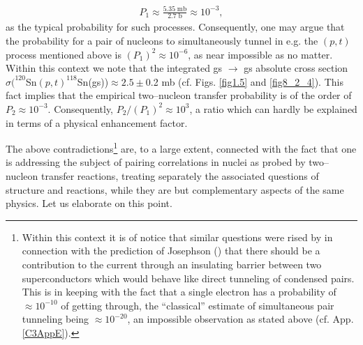 \begin{align}
P_1\approx\frac{5.35\; \text{mb}}{2.7\;\text{b}}\approx 10^{-3},
\end{align}
as the typical probability for such processes. Consequently, one may argue that the probability for a  pair of nucleons to simultaneously tunnel in e.g. the $(p,t)$ process mentioned above is $(P_1)^2\approx10^{-6}$, as near impossible as no matter. Within this context we note that the integrated gs $\rightarrow$ gs absolute cross section $\sigma(^{120}$Sn$(p,t)^{118}$Sn(gs))$\approx 2.5 \pm$0.2 mb (cf. Figs. \ref{fig1.5} and \ref{fig8_2_4}). This fact implies that the empirical two--nucleon transfer probability is of the order of $P_2\approx 10^{-3}$. Consequently, $P_2/(P_1)^2\approx 10^{3}$, a ratio which can hardly be explained in terms of a physical enhancement factor.


The above contradictions\footnote{Within this context it is of notice that similar questions were rised by \cite{Bardeen:62,Bardeen:61,Pippard:12,Cohen:62,McDonald:01} in connection with the prediction of Josephson (\cite{Josephson:62}) that there should be a contribution to the current through an insulating barrier between two superconductors which would behave like direct tunneling of condensed pairs. This is in keeping with the fact that a single electron has a probability of $\approx 10^{-10}$ of getting through, the ``classical'' estimate of simultaneous pair tunneling being $\approx 10^{-20}$, an impossible observation as stated above (cf. App. \ref{C3AppE}).}  are, to a large extent, connected with the fact that one is addressing the subject of pairing correlations in nuclei as probed by two--nucleon transfer reactions, treating separately the associated questions of structure and reactions, while they are but complementary aspects of the same physics. Let us elaborate on this point. 


